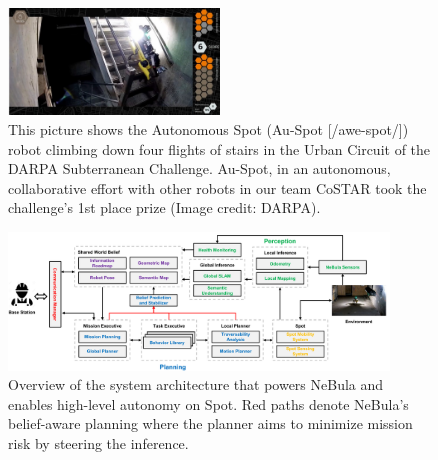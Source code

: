 \documentclass[letterpaper, 10pt, conference]{ieeeconf}      %
\newcommand{\rev}[1]{{\color{blue} #1 }} %
\begin{document}

\begin{figure}[t!]
  \centering
  \includegraphics[width=0.5\textwidth]{graphics/spot_cover_ver1.jpg}
  \caption{This picture shows the Autonomous Spot (Au-Spot [/awe-spot/]) robot climbing down four flights of stairs in the Urban Circuit of the DARPA Subterranean Challenge. \rev{Au-Spot, in an autonomous, collaborative effort with other robots in our team CoSTAR took the challenge's 1st place prize (Image credit: DARPA).}} 
  
  
  \label{fig:stairs-firstPage}
\end{figure}

\begin{figure}[h!]
  \centering
  \includegraphics[width=0.9\textwidth]{graphics/spot_sa_v4.pdf}
  \caption{Overview of the system architecture \rev{that powers}NeBula and enables high-level autonomy on Spot. \rev{Red paths denote NeBula's belief-aware planning where the planner aims to minimize mission risk by steering the inference.} 
}
  \label{fig:spot_sysarch}
\end{figure}
\end{document}
